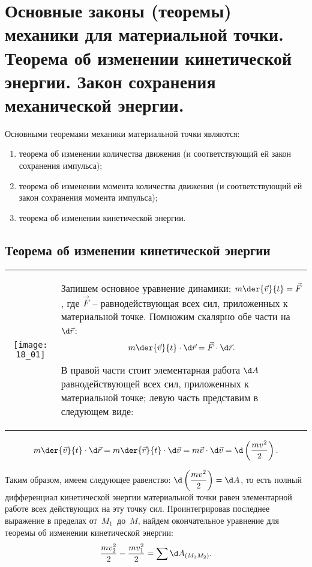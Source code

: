 \chapter{Основные законы (теоремы) механики для материальной точки. Теорема об
изменении кинетической энергии. Закон сохранения механической энергии.}

Основными теоремами механики материальной точки являются:
\begin{enumerate}
    \item теорема об изменении количества движения (и соответствующий ей закон
    сохранения импульса);
    \item теорема об изменении момента количества движения (и соответствующий ей
    закон сохранения момента импульса);
    \item теорема об изменении кинетической энергии.
\end{enumerate}

\section{Теорема об изменении кинетической энергии}

\begin{table}[h!]
    \begin{tabular}{C{.4}m{.5\textwidth}}
        \texttt{[image: 18\_01]} &
        Запишем основное уравнение динамики: \( \ds m\der{\vec{v}}{t} = \vec{F} \), где
        \( \vec{F} \) -- равнодействующая всех сил, приложенных к материальной точке.
        Помножим скалярно обе части на \( \d\vec{r} \):
        \[
            m\der{\vec{v}}{t}\cdot\d\vec{r} = \vec{F}\cdot\d\vec{r}.
        \]
        
        В правой части стоит элементарная работа \( \d A \) равнодействующей всех сил,
        приложенных к материальной точке; левую часть представим в следующем виде:
    \end{tabular}
\end{table}

\[
    m\der{\vec{v}}{t}\cdot\d\vec{r} = m\der{\vec{r}}{t}\cdot\d\vec{v} = m\vec{v}
    \cdot\d\vec{v} = \d\left(\frac{mv^2}{2}\right).
\]

Таким образом, имеем следующее равенство:
\( \ds \d\left(\frac{mv^2}{2}\right) = \d A\), то есть полный дифференциал
кинетической энергии материальной точки равен элементарной работе всех
действующих на эту точку сил. Проинтегрировав последнее выражение в пределах
от~\( M_1 \)~до~\( M \), найдем окончательное уравнение для теоремы об изменении
кинетической энергии:
\[
    \frac{mv_2^2}{2} - \frac{mv_1^2}{2} = \sum \d A_{(M_1M_2)}.
\]

